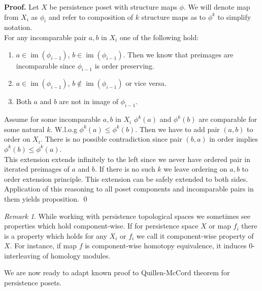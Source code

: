 \documentclass[a4paper, 12pt]{article}
\theoremstyle{definition}
\theoremstyle{remark}
\newtheorem{remark}{Remark}
\newenvironment{pf}{\noindent\textbf{Proof.}}{\qed}
\renewcommand{\leq}{\leqslant}
\begin{document}
\begin{pf}
  Let $X$ be persistence poset with structure maps $\phi$. We will denote map from $X_i$ as $\phi_i$ and refer to composition of $k$ structure maps as to $\phi^k$ to simplify notation.\\

  For any incomparable pair $a,b$ in $X_i$ one of the following hold:
  \begin{enumerate}
    \item $a \in \operatorname{im}(\phi_{i-1})$, $b \in \operatorname{im}(\phi_{i-1})$. Then we know that preimages are incomparable since $\phi_{i-1}$ is order preserving.
    \item $a \in \operatorname{im}(\phi_{i-1})$, $b \not\in \operatorname{im}(\phi_{i-1})$ or vice versa.
    \item Both $a$ and $b$ are not in image of $\phi_{i-1}$.
  \end{enumerate}

  Assume for some incomparable $a,b$ in $X_i$ $\phi^k(a)$ and $\phi^k(b)$ are comparable for some natural $k$. W.l.o.g $\phi^k(a) \leq \phi^k(b)$. Then we have to add pair $(a,b)$ to order on $X_i$. There is no possible contradiction since pair $(b,a)$ in order implies $\phi^k(b) \leq \phi^k(a)$.\\
  This extension extends infinitely to the left since we never have ordered pair in iterated preimages of $a$ and $b$. If there is no such $k$ we leave ordering on $a,b$ to order extension principle. This extension can be safely extended to both sides.\\

  Application of this reasoning to all poset components and incomparable pairs in them yields proposition.
\end{pf}\\

\begin{remark}
  While working with persistence topological spaces we sometimes see properties which hold component-wise. If for persistence space $X$ or map $f_i$ there is a property which holds for any $X_i$ or $f_i$ we call it component-wise property of $X$. For instance, if map $f$ is component-wise homotopy equivalence, it induces $0$-interleaving of homology modules.
\end{remark}

We are now ready to adapt known proof to Quillen-McCord theorem for persistence posets.
\end{document}
